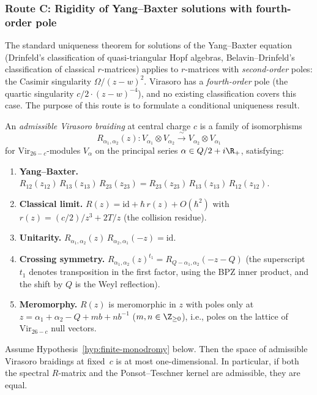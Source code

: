 \subsubsection{Route C: Rigidity of Yang--Baxter solutions with
fourth-order pole}
\label{subsubsec:route-C-rigidity}

The standard uniqueness theorem for solutions of the Yang--Baxter
equation (Drinfeld's classification of quasi-triangular Hopf algebras,
Belavin--Drinfeld's classification of classical $r$-matrices) applies
to $r$-matrices with \emph{second-order} poles: the Casimir
singularity $\Omega/(z-w)^2$. Virasoro has a \emph{fourth-order}
pole (the quartic singularity $c/2 \cdot (z-w)^{-4}$), and no
existing classification covers this case. The purpose of this route
is to formulate a conditional uniqueness result.

\begin{definition}
\label{def:admissible-vir-braiding}
An \emph{admissible Virasoro braiding} at central charge $c$ is a
family of isomorphisms
\[
R_{\alpha_1,\alpha_2}(z) \colon V_{\alpha_1} \otimes V_{\alpha_2}
\xrightarrow{\ \sim\ }
V_{\alpha_2} \otimes V_{\alpha_1}
\]
for $\mathrm{Vir}_{26-c}$-modules $V_\alpha$ on the principal
series $\alpha \in Q/2 + i\R_+$, satisfying:
\begin{enumerate}[label=\textup{(R\arabic*)}]
\item \textbf{Yang--Baxter.}
 $R_{12}(z_{12})\,R_{13}(z_{13})\,R_{23}(z_{23}) =
 R_{23}(z_{23})\,R_{13}(z_{13})\,R_{12}(z_{12})$.
\item \textbf{Classical limit.}
 $R(z) = \mathrm{id} + \hbar\,r(z) + O(\hbar^2)$ with
 $r(z) = (c/2)/z^3 + 2T/z$ (the collision residue).
\item \textbf{Unitarity.}
 $R_{\alpha_1,\alpha_2}(z)\,
 R_{\alpha_2,\alpha_1}(-z) = \mathrm{id}$.
\item \textbf{Crossing symmetry.}
 $R_{\alpha_1,\alpha_2}(z)^{t_1} =
 R_{Q-\alpha_1,\alpha_2}(-z - Q)$
 (the superscript $t_1$ denotes transposition in the first
 factor, using the BPZ inner product, and the shift by $Q$ is
 the Weyl reflection).
\item \textbf{Meromorphy.}
 $R(z)$ is meromorphic in $z$ with poles only at
 $z = \alpha_1 + \alpha_2 - Q + mb + nb^{-1}$
 ($m,n \in \Z_{\ge 0}$), i.e., poles on the lattice of
 $\mathrm{Vir}_{26-c}$ null vectors.
\end{enumerate}
\end{definition}

\begin{theorem}
\label{thm:conditional-uniqueness}
Assume Hypothesis~\textup{\ref{hyp:finite-monodromy}} below.
Then the space of admissible Virasoro braidings at fixed~$c$ is
at most one-dimensional. In particular, if both the spectral
$R$-matrix and the Ponsot--Teschner kernel are admissible, they
are equal.
\end{theorem}

